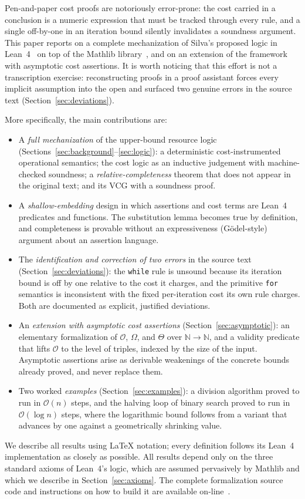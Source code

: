 \documentclass[runningheads]{llncs}
\newcommand{\Lean}{Lean~4\xspace}
\newcommand{\Nat}{\mathbb{N}}
\newcommand{\BigO}{\mathcal{O}}
\newcommand{\BigTh}{\Theta}
\newcommand{\BigOm}{\Omega}
\newcommand{\code}[1]{\texttt{#1}}
\begin{document}
Pen-and-paper cost proofs are notoriously error-prone: the cost carried in a
conclusion is a numeric expression that must be tracked through every
rule, and a
single off-by-one in an iteration bound silently invalidates a soundness
argument.
This paper reports on a complete mechanization of Silva's proposed logic in
\Lean{}~\cite{Moura2021} on top of the Mathlib library~\cite{Mathlib2020},
and on an extension of the framework with asymptotic cost assertions.
It is worth noticing that this effort is not a transcription exercise:
reconstructing proofs in a
proof assistant forces every implicit assumption into the open and surfaced two
genuine errors in the source text (Section~\ref{sec:deviations}).

More specifically, the main contributions are:
\begin{itemize}
\item A \emph{full mechanization} of the upper-bound resource logic
(Sections~\ref{sec:background}--\ref{sec:logic}): a
deterministic
cost-instrumented operational semantics; the cost
logic as an inductive
judgement with machine-checked soundness; a
\emph{relative-completeness}
theorem that does not
appear in the original text;
and its VCG with a soundness proof.
\item A \emph{shallow-embedding} design in which assertions
and cost terms are
\Lean{} predicates and functions.
The substitution lemma becomes true by definition,
and completeness is
provable without an expressiveness (G\"odel-style)
argument about an
assertion language.
\item The \emph{identification and correction of two errors}
in the source
text (Section~\ref{sec:deviations}): the \code{while}
rule is unsound because its iteration bound is off by
one relative to the cost it charges, and the primitive
\code{for} semantics is inconsistent with the fixed
per-iteration cost its own rule charges.
Both are documented as explicit, justified deviations.
\item An \emph{extension with asymptotic cost assertions}
(Section~\ref{sec:asymptotic}): an elementary
formalization of $\BigO$,
$\BigOm$, and $\BigTh$ over $\Nat \to \Nat$, and a
validity predicate
that lifts $\BigO$ to the level of triples,
indexed by the size of the
input.
Asymptotic assertions arise as derivable weakenings
of the concrete bounds
already proved, and never replace them.
\item Two worked \emph{examples}
(Section~\ref{sec:examples}): a division
algorithm proved to run in $\BigO(n)$ steps, and the
halving loop of binary search proved to run in
$\BigO(\log n)$ steps, where the logarithmic bound
follows from a variant that advances by one against a
geometrically shrinking value.
\end{itemize}
We describe all results using \LaTeX{} notation; every definition follows its
\Lean{} implementation as closely as possible.
All results depend only on the three standard
axioms of \Lean{}'s logic, which are assumed pervasively by Mathlib and which we
describe in Section~\ref{sec:axioms}.
The complete formalization source code and instructions on how to build it are available on-line~\cite{repo-logic}.
\end{document}
